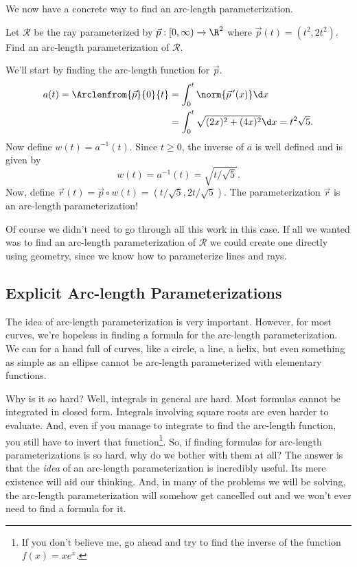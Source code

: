 We now have a concrete way to find an arc-length parameterization.
\begin{example}
	Let $\mathcal R$ be the ray parameterized by 
	$\vec p:[0,\infty)\to\R^2$ where $\vec p(t) = (t^2,2t^2)$.  Find an arc-length
	parameterization of $\mathcal R$.

	We'll start by finding the arc-length function for $\vec p$.
	\begin{align*}
		a(t)=\Arclenfrom{\vec p}{0}{t} &= \int_0^t \norm{\vec p\,'(x)}\d x\\
		&=\int_0^t \sqrt{(2x)^2+(4x)^2}\d x = t^2\sqrt{5}.
	\end{align*}
	Now define $w(t)=a^{-1}(t)$.  Since $t\geq 0$, the inverse of $a$ is well defined
	and is given by
	\[
		w(t)=a^{-1}(t) = \sqrt{t/\sqrt{5}}.
	\]
	Now, define $\vec r(t) = \vec p\circ w(t)=(t/\sqrt{5},2t/\sqrt{5})$.  The parameterization
	$\vec r$ is an arc-length parameterization!

	Of course we didn't need to go through all this work in this case.  If all we wanted was
	to find an arc-length parameterization of $\mathcal R$ we could create one directly using
	geometry, since we know how to parameterize lines and rays.
\end{example}

\subsection{Explicit Arc-length Parameterizations}
The idea of arc-length parameterization is very important.  However, for most curves,
we're hopeless in finding a formula for the arc-length parameterization.  We can for a hand
full of curves, like a circle, a line, a helix, but even something as simple as an ellipse
cannot be arc-length parameterized with elementary functions.

Why is it so hard?  Well, integrals in general are hard.  Most formulas cannot be integrated in closed
form.  Integrals involving square roots are even harder to evaluate.  And, even if you manage
to integrate to find the arc-length function, you still have to invert that function\footnote{ If you don't
believe me, go ahead and 
try to find the inverse of the function $f(x)=xe^x$. }.  So, if finding formulas for arc-length parameterizations
is so hard, why do we bother with them at all?  The answer is that the \emph{idea} of an arc-length parameterization
is incredibly useful. Its mere existence will aid our thinking.  And, in many of the problems we will be solving,
the arc-length parameterization will somehow get cancelled out and we won't ever need to find a formula for it.

